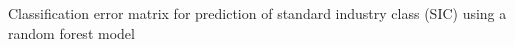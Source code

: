 Classification error matrix for prediction of standard industry class (SIC) using a random forest model
\label{fig:industry_classification}